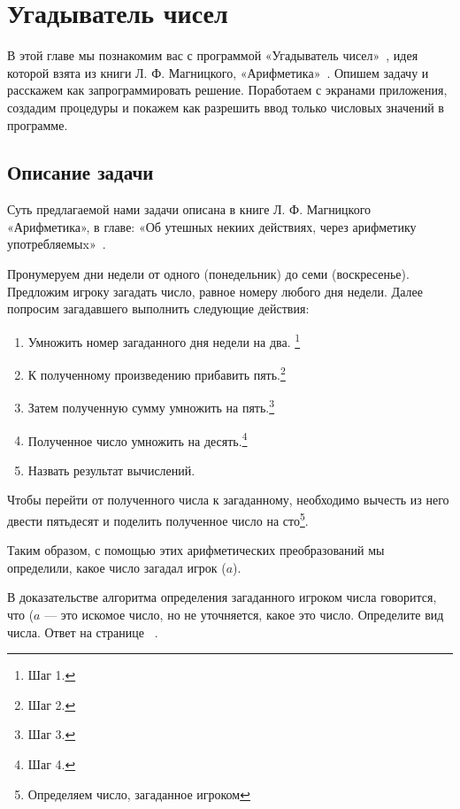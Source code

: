 \chapter{Угадыватель чисел}
\label{ch:guessnumbers}

В этой главе мы познакомим вас с программой «Угадыватель чисел»~\cite{PanfilovaApp}, идея которой взята из книги Л. Ф. Магницкого, «Арифметика»~\cite{Galanin}. 
Опишем задачу и расскажем как запрограммировать решение. Поработаем с экранами приложения, создадим процедуры и покажем как разрешить ввод только числовых значений в программе.


\section{Описание задачи}

Суть предлагаемой нами задачи описана в книге Л. Ф. Магницкого «Арифметика», в главе: «Об утешных некиих действиях, через арифметику употребляемыx»~\cite{Galanin}.

Пронумеруем дни недели от одного (понедельник) до семи (воскресенье). 
Предложим игроку загадать число, равное номеру любого дня недели. Далее попросим загадавшего выполнить следующие действия:
\begin{enumerate}
\item Умножить номер загаданного дня недели на два. \footnote[][-0cm]{Шаг 1.} 
\item К полученному произведению прибавить пять.\footnote[][-0cm]{Шаг 2.} 
\item Затем полученную сумму умножить на пять.\footnote[][-0cm]{Шаг 3.} 
\item Полученное число умножить на десять.\footnote[][-0cm]{Шаг 4.} 
\item Назвать результат вычислений.
\end{enumerate}

Чтобы перейти от полученного числа к загаданному, необходимо вычесть из него двести пятьдесят и поделить полученное число на сто\footnote[][-0cm]{Определяем число, загаданное игроком}. 

Таким образом, с помощью этих арифметических преобразований мы определили, какое число загадал игрок ($ a $).
\begin{mdfstyle}[nobreak=true,frametitle=Вопрос]
  \sloppy   
  В доказательстве алгоритма определения загаданного игроком числа говорится, что ($ a $ — это искомое число, но не уточняется, какое это число. 
  Определите вид числа.  Ответ на странице ~\pageref{answer:guess_numbers_task}.
  \label{question:text}
\end{mdfstyle}

